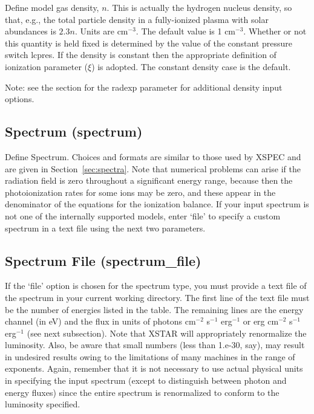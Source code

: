 Define model gas density, $n$.  This is actually the hydrogen nucleus
density, so that, e.g., the total particle density in a fully-ionized
plasma with solar abundances is $2.3 n$.  
Units are cm$^{-3}$.  The default value is 
1 cm$^{-3}$.  Whether or not this quantity is  held fixed  is determined 
by the value of the constant pressure switch lcpres. 
If the density is constant then  the appropriate definition 
of ionization parameter ($\xi$) is adopted.
The constant density case is the default.

Note:  see the section for the radexp parameter for additional density
input options.

\subsection{Spectrum (spectrum)}  

Define Spectrum.  Choices and formats are similar to those used 
by XSPEC and are given in Section~\ref{sec:spectra}.  
Note that numerical problems can arise if the radiation field is zero
throughout a significant energy range, because then the photoionization rates
for some ions may be zero, and these appear in the denominator of the 
equations for the ionization balance.  If your input spectrum is not 
one of the internally supported models, enter `file' to specify a 
custom spectrum in a text file using the next two parameters.

\subsection{Spectrum File (spectrum\_file)}

If the `file' option is chosen for the spectrum type, you must 
provide a text file of the spectrum in your current working 
directory.  The first line of the text file must be the number of 
energies listed in the table.  The remaining lines are the energy 
channel (in eV) and the flux in units of photons cm$^{-2}$ s$^{-1}$ erg$^{-1}$ or 
erg cm$^{-2}$ s$^{-1}$ erg$^{-1}$ (see next subsection).  Note that XSTAR will 
appropriately renormalize the luminosity.  Also, be aware 
that small numbers (less than 1.e-30, say), may result 
in undesired results owing to the limitations of many machines 
in the range of exponents.  Again, remember that it is not 
necessary to use actual physical units in specifying the input spectrum
(except to distinguish between photon and energy fluxes)
since the entire spectrum is renormalized to conform to the 
luminosity specified.

